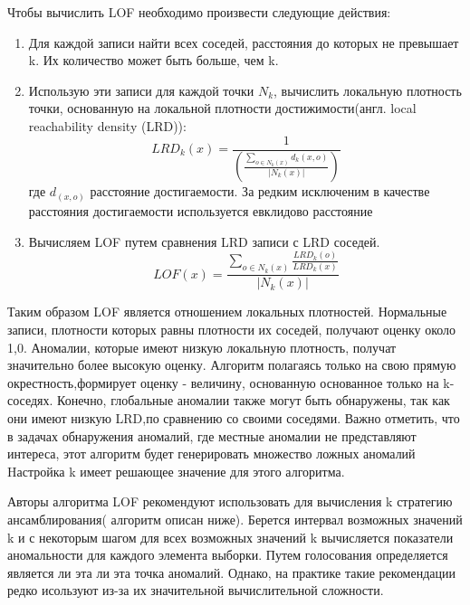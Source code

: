  Чтобы вычислить LOF необходимо произвести следующие действия:
 \begin{enumerate}
 	\item Для каждой записи найти всех соседей, расстояния до которых не превышает k. Их количество может быть больше, чем k.
 	\item Использую эти записи для каждой точки $N_k$, вычислить локальную плотность точки, основанную на локальной плотности достижимости(англ. local reachability density (LRD)):
 	\begin{equation}
 	LRD_k(x) = \frac{1}{(\frac{\sum_{o \in N_k(x)}d_k (x,o)}{|N_k (x)|})}
 	\end{equation}
 	где $d_(x,o)$ расстояние достигаемости. За редким исключеним в качестве расстояния достигаемости используется евклидово расстояние \cite{Book12}
 	\item Вычисляем LOF путем сравнения LRD записи с LRD соседей.
 	\begin{equation}
 	LOF(x) = \frac{\sum_{o \in N_k(x)}\frac{LRD_k (o)}{LRD_k (x)}}{|N_k (x)|}
 	\end{equation}
 \end{enumerate}
 Таким образом LOF является отношением локальных плотностей.  Нормальные записи, плотности которых равны плотности их соседей, получают оценку около 1,0. Аномалии, которые имеют низкую локальную плотность, получат значительно более высокую оценку. Алгоритм полагаясь только на свою прямую окрестность,формирует  оценку - величину, основанную основанное только на k-соседях. Конечно, глобальные аномалии также могут быть обнаружены, так как они  имеют низкую LRD,по сравнению со своими соседями. Важно отметить, что в задачах обнаружения аномалий, где местные аномалии не представляют интереса, этот алгоритм будет генерировать множество ложных аномалий Hастройка k имеет решающее значение для этого алгоритма.
 
 Авторы алгоритма LOF рекомендуют использовать для вычисления k стратегию ансамблирования( алгоритм описан ниже). Берется интервал возможных значений k и с некоторым шагом для всех возможных значений k вычисляется показатели аномальности для каждого элемента выборки. Путем голосования определяется является ли эта ли эта точка аномалий. Однако, на практике такие рекомендации редко исользуют из-за их значительной вычислительной сложности.
